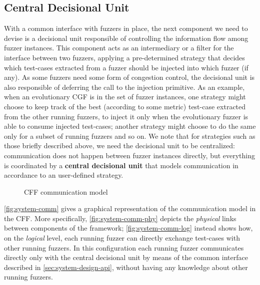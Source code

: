 \subsection{Central Decisional Unit}
\label{sec:system-design-cdu}
With a common interface with fuzzers in place, the next component we need to
devise is a decisional unit responsible of controlling the information flow
among fuzzer instances. This component acts as an intermediary or a filter for
the interface between two fuzzers, applying a pre-determined strategy that
decides which test-cases extracted from a fuzzer should be injected into which
fuzzer (if any). As some fuzzers need some form of congestion control, the
decisional unit is also responsible of deferring the call to the injection
primitive. As an example, when an evolutionary \ac{CGF} is in the set of fuzzer
instances, one strategy might choose to keep track of the best (according to
some metric) test-case extracted from the other running fuzzers, to inject it
only when the evolutionary fuzzer is able to consume injected test-cases;
another strategy might choose to do the same only for a subset of running
fuzzers and so on. We note that for strategies such as those briefly described
above, we need the decisional unit to be centralized: communication does not
happen between fuzzer instances directly, but everything is coordinated by a
\textbf{central decisional unit} that models communication in accordance to an
user-defined strategy.

\begin{figure}
    \centering
    \qquad
\caption{\acl{CFF} communication model}
\label{fig:system-comm}
\end{figure}

\autoref{fig:system-comm} gives a graphical representation of the
communication model in the \ac{CFF}. More specifically,
\autoref{fig:system-comm-phy} depicts the \emph{physical} links between
components of the framework; \autoref{fig:system-comm-log} instead shows how,
on the \emph{logical} level, each running fuzzer can directly exchange
test-cases with other running fuzzers. In this configuration each running fuzzer
communicates directly only with the central decisional unit by means of the
common interface described in \autoref{sec:system-design-api}, without
having any knowledge about other running fuzzers.

